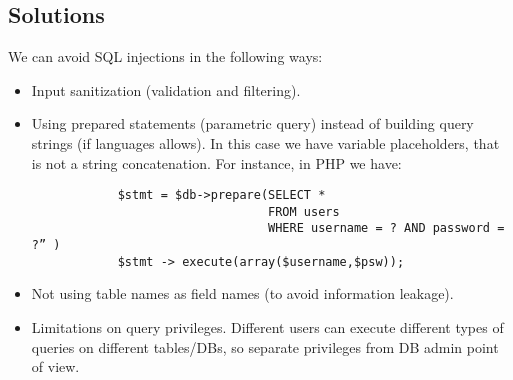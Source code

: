 \subsection{Solutions}
We can avoid SQL injections in the following ways: 
\begin{itemize}
    \item Input sanitization (validation and filtering). 
    \item Using prepared statements (parametric query) instead of building query strings (if languages allows). 
        In this case we have variable placeholders, that is not a string concatenation. 
        For instance, in PHP we have: 
        \begin{verbatim}
            $stmt = $db->prepare(SELECT * 
                                 FROM users
                                 WHERE username = ? AND password = ?” )
            $stmt -> execute(array($username,$psw));
        \end{verbatim}
    \item Not using table names as field names (to avoid information leakage). 
    \item Limitations on query privileges. 
        Different users can execute different types of queries on different tables/DBs, so separate privileges from DB admin point of view. 
\end{itemize}